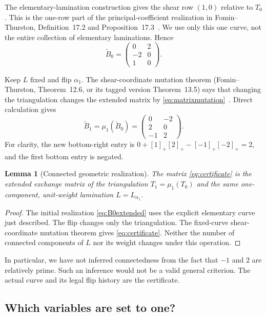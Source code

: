 \documentclass[11pt,letterpaper]{article}
\numberwithin{equation}{section}
\newtheorem{lemma}[theorem]{Lemma}
\theoremstyle{definition}
\newcommand{\Btilde}{\widetilde B}
\begin{document}
The elementary-lamination construction gives the shear row $(1,0)$ relative
to $T_0$. This is the one-row part of the principal-coefficient realization in
Fomin--Thurston, Definition~17.2 and Proposition~17.3~\cite{FT}. We use only
this one curve, not the entire collection of elementary laminations. Hence
\begin{equation}\label{eq:B0extended}
 \Btilde_0=\begin{pmatrix}0&2\\-2&0\\1&0\end{pmatrix}.
\end{equation}

Keep $L$ fixed and flip $\alpha_1$. The shear-coordinate mutation theorem
(Fomin--Thurston, Theorem~12.6, or its tagged version Theorem~13.5) says that
changing the triangulation changes the extended matrix by
\eqref{eq:matrixmutation}~\cite{FT}. Direct calculation gives
\begin{equation}\label{eq:certificate}
 \Btilde_1=\mu_1(\Btilde_0)
 =\begin{pmatrix}0&-2\\2&0\\-1&2\end{pmatrix}.
\end{equation}
For clarity, the new bottom-right entry is
$0+[1]_+[2]_+-[-1]_+[-2]_+=2$, and the first bottom entry is negated.

\begin{lemma}[Connected geometric realization]\label{lem:realization}
The matrix \eqref{eq:certificate} is the extended exchange matrix of the
triangulation $T_1=\mu_1(T_0)$ and the same one-component, unit-weight lamination
$L=L_{\alpha_1}$.
\end{lemma}
\begin{proof}
The initial realization \eqref{eq:B0extended} uses the explicit elementary
curve just described. The flip changes only the triangulation. The fixed-curve
shear-coordinate mutation theorem gives \eqref{eq:certificate}. Neither the
number of connected components of $L$ nor its weight changes under this
operation.
\end{proof}

In particular, we have not inferred connectedness from the fact that $-1$ and
$2$ are relatively prime. Such an inference would not be a valid general
criterion. The actual curve and its legal flip history are the certificate.

\subsection{Which variables are set to one?}\label{sec:reseed}
\end{document}
